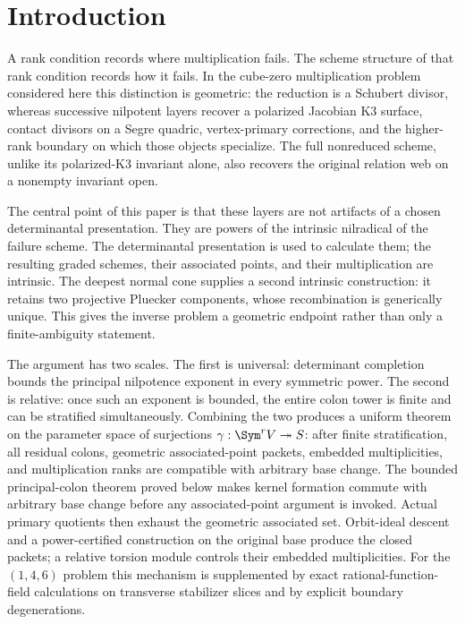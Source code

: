 \section{Introduction}
\label{sec:introduction-v132}

A rank condition records where multiplication fails.  The scheme
structure of that rank condition records how it fails.  In the
cube-zero multiplication problem considered here this distinction is
geometric: the reduction is a Schubert divisor, whereas successive
nilpotent layers recover a polarized Jacobian K3 surface, contact
divisors on a Segre quadric, vertex-primary corrections, and the
higher-rank boundary on which those objects specialize.  The full
nonreduced scheme, unlike its polarized-K3 invariant alone, also
recovers the original relation web on a nonempty invariant open.

The central point of this paper is that these layers are not artifacts
of a chosen determinantal presentation.  They are powers of the
intrinsic nilradical of the failure scheme.  The determinantal
presentation is used to calculate them; the resulting graded schemes,
their associated points, and their multiplication are intrinsic.
The deepest normal cone supplies a second intrinsic construction: it
retains two projective Pluecker components, whose recombination is
generically unique.  This gives the inverse problem a geometric
endpoint rather than only a finite-ambiguity statement.

The argument has two scales.  The first is universal: determinant
completion bounds the principal nilpotence exponent in every symmetric
power.  The second is relative: once such an exponent is bounded, the
entire colon tower is finite and can be stratified simultaneously.
Combining the two produces a uniform theorem on the parameter space of
surjections \(\gamma:\Sym^rV\twoheadrightarrow S\): after finite
stratification, all residual colons, geometric associated-point packets,
embedded multiplicities, and multiplication ranks are compatible with
arbitrary base change.
The bounded principal-colon theorem proved below makes kernel formation
commute with arbitrary base change before any associated-point
argument is invoked.  Actual primary quotients then exhaust the geometric associated set.
Orbit-ideal descent and a power-certified construction on the
original base produce the closed packets; a relative torsion module
controls their embedded multiplicities.
For the \((1,4,6)\) problem this mechanism is supplemented by exact
rational-function-field calculations on transverse stabilizer slices
and by explicit boundary degenerations.

